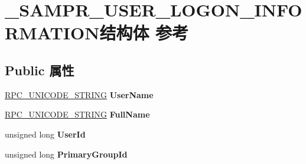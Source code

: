 \hypertarget{struct___s_a_m_p_r___u_s_e_r___l_o_g_o_n___i_n_f_o_r_m_a_t_i_o_n}{}\section{\+\_\+\+S\+A\+M\+P\+R\+\_\+\+U\+S\+E\+R\+\_\+\+L\+O\+G\+O\+N\+\_\+\+I\+N\+F\+O\+R\+M\+A\+T\+I\+O\+N结构体 参考}
\label{struct___s_a_m_p_r___u_s_e_r___l_o_g_o_n___i_n_f_o_r_m_a_t_i_o_n}
\subsection*{Public 属性}
\begin{DoxyCompactItemize}
\item 
\mbox{\label{struct___s_a_m_p_r___u_s_e_r___l_o_g_o_n___i_n_f_o_r_m_a_t_i_o_n_a7086027b69ab7fb9342cd297b06a9be3}} 
\hyperlink{struct___r_p_c___u_n_i_c_o_d_e___s_t_r_i_n_g}{R\+P\+C\+\_\+\+U\+N\+I\+C\+O\+D\+E\+\_\+\+S\+T\+R\+I\+NG} {\bfseries User\+Name}
\item 
\mbox{\label{struct___s_a_m_p_r___u_s_e_r___l_o_g_o_n___i_n_f_o_r_m_a_t_i_o_n_aa115bdf4f82323752f2ea60f71d10fd5}} 
\hyperlink{struct___r_p_c___u_n_i_c_o_d_e___s_t_r_i_n_g}{R\+P\+C\+\_\+\+U\+N\+I\+C\+O\+D\+E\+\_\+\+S\+T\+R\+I\+NG} {\bfseries Full\+Name}
\item 
\mbox{\label{struct___s_a_m_p_r___u_s_e_r___l_o_g_o_n___i_n_f_o_r_m_a_t_i_o_n_ada6d7fcc80bfb8bf74aa7e6418cc2001}} 
unsigned long {\bfseries User\+Id}
\item 
\mbox{\label{struct___s_a_m_p_r___u_s_e_r___l_o_g_o_n___i_n_f_o_r_m_a_t_i_o_n_a0c39b2e5ccd8b50cc785a80db5ae63e6}} 
unsigned long {\bfseries Primary\+Group\+Id}
\item 
\mbox{\label{struct___s_a_m_p_r___u_s_e_r___l_o_g_o_n___i_n_f_o_r_m_a_t_i_o_n_a06870b4a6a3c23e300c290099dceeac0}} 

\end{DoxyCompactItemize}
